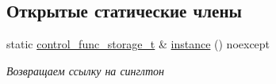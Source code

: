 \subsection*{Открытые статические члены}
\begin{DoxyCompactItemize}
\item 
static \hyperlink{classLIBKMS__namespace_1_1ControlFuncStorage_ad9bffebc36d4a24c52884274e207ecd7}{control\-\_\-func\-\_\-storage\-\_\-t} \& \hyperlink{classLIBKMS__namespace_1_1ControlFuncStorage_a11f70db0ce25a1062bf0e0050d92415d}{instance} () noexcept
\begin{DoxyCompactList}\small\item\em Возвращаем ссылку на синглтон \end{DoxyCompactList}\end{DoxyCompactItemize}


